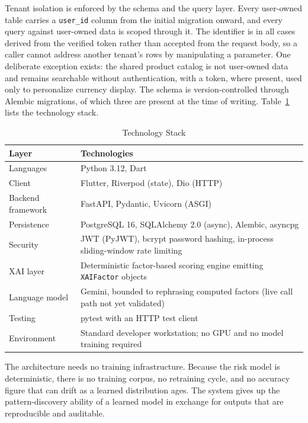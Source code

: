 \documentclass[conference]{IEEEtran}
\begin{document}
Tenant isolation is enforced by the schema and the query layer. Every user-owned table carries a \texttt{user\_id} column from the initial migration onward, and every query against user-owned data is scoped through it. The identifier is in all cases derived from the verified token rather than accepted from the request body, so a caller cannot address another tenant's rows by manipulating a parameter. One deliberate exception exists: the shared product catalog is not user-owned data and remains searchable without authentication, with a token, where present, used only to personalize currency display. The schema is version-controlled through Alembic migrations, of which three are present at the time of writing. Table~\ref{tab:techstack} lists the technology stack.

\begin{table}[!t]
\centering
\caption{Technology Stack}
\label{tab:techstack}
\footnotesize
\renewcommand{\arraystretch}{1.3}
\begin{tabular}{|p{2.4cm}|p{5.3cm}|}
\hline
\textbf{Layer} & \textbf{Technologies} \\
\hline
Languages & Python 3.12, Dart \\
\hline
Client & Flutter, Riverpod (state), Dio (HTTP) \\
\hline
Backend framework & FastAPI, Pydantic, Uvicorn (ASGI) \\
\hline
Persistence & PostgreSQL 16, SQLAlchemy 2.0 (async), Alembic, asyncpg \\
\hline
Security & JWT (PyJWT), bcrypt password hashing, in-process sliding-window rate limiting \\
\hline
XAI layer & Deterministic factor-based scoring engine emitting \texttt{XAIFactor} objects \\
\hline
Language model & Gemini, bounded to rephrasing computed factors (live call path not yet validated) \\
\hline
Testing & pytest with an HTTP test client \\
\hline
Environment & Standard developer workstation; no GPU and no model training required \\
\hline
\end{tabular}
\end{table}

The architecture needs no training infrastructure. Because the risk model is deterministic, there is no training corpus, no retraining cycle, and no accuracy figure that can drift as a learned distribution ages. The system gives up the pattern-discovery ability of a learned model in exchange for outputs that are reproducible and auditable.
\end{document}
